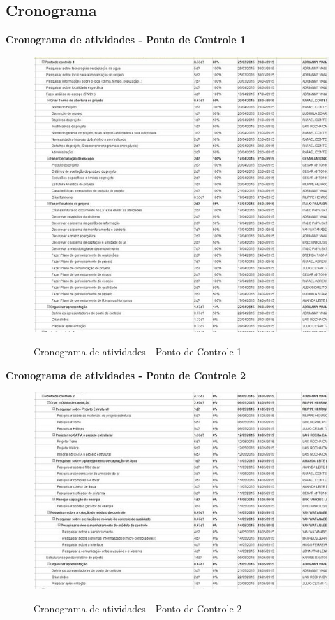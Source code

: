   \pagebreak
  \subsection{Cronograma}
   
   \textbf{Cronograma de atividades - Ponto de Controle 1}
   \begin{figure}[!h]
    \centering
    \includegraphics[scale = 0.8]{editaveis/figuras/cronogramaPC1}
    \label{Cronograma de atividades PC1}
    \caption{Cronograma de atividades - Ponto de Controle 1}
   \end{figure}
   \FloatBarrier
   
   \pagebreak
   \textbf{Cronograma de atividades - Ponto de Controle 2}
   \begin{figure}[!h]
    \centering
    \includegraphics[scale = 0.8]{editaveis/figuras/cronogramaPC2}
    \label{Cronograma de atividades PC2}
    \caption{Cronograma de atividades - Ponto de Controle 2}
   \end{figure}
   \FloatBarrier
   
